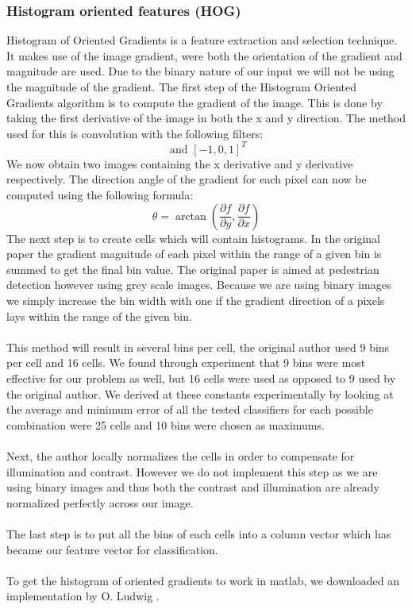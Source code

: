 \documentclass[%
        compressed,
        final,
        notitlepage,
        narroweqnarray,
        inline,
        twoside,
        ]{ieee}
\begin{document}
\subsubsection{Histogram oriented features (HOG)}
Histogram of Oriented Gradients is a feature extraction and selection technique.
\cite{hog} It makes use of the image gradient, were both the orientation of the gradient and magnitude are used. Due to the binary nature of our input we will not be using the magnitude of the gradient. The first step of the Histogram Oriented Gradients algorithm is to compute the gradient of the image. This is done by taking the first derivative of the image in both the x and y direction. The method used for this is convolution with the following filters:
\begin{equation}
    [-1, 0, 1] \text{ and } [-1, 0, 1]^T
\end{equation}
We now obtain two images containing the x derivative and y derivative respectively. The direction angle of the gradient for each pixel can now be computed using the following formula: 
\begin{equation}
    \theta = \arctan\left(\frac{\partial f}{\partial y}, 
        \frac{\partial f}{\partial x}\right)
\end{equation}
The next step is to create cells which will contain histograms. In the original
paper the gradient magnitude of each pixel within the range of a given bin is
summed to get the final bin value. The original paper is aimed at pedestrian
detection however using grey scale images. Because we are using binary images we
simply increase the bin width with one if the gradient direction of a pixels lays within the range of the given bin.\\\\
This method will result in several bins per cell, the original author used 9
bins per cell and 16 cells. We found through experiment that 9 bins were most effective for
our problem as well, but 16 cells were used as opposed to 9 used by the original author.
We derived at these constants experimentally by looking at the average and
minimum error of all the tested classifiers for each possible combination were
25 cells and 10 bins were chosen as maximums. \\\\
Next, the author locally normalizes the cells in order to compensate for illumination and contrast. However we do not implement this step as we are using binary images and thus both the contrast and illumination are already normalized perfectly across our image.\\\\
The last step is to put all the bins of each cells into a column vector which
has became our feature vector for classification. \\\\
To get the histogram of oriented gradients to work in matlab, we downloaded an
implementation by O. Ludwig \cite{Ludwig}. 
\end{document}
